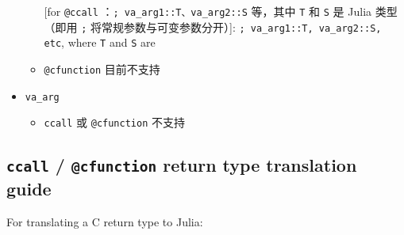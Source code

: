 \begin{itemize}
\begin{itemize}
\item [[for \texttt{@ccall}]：\texttt{; va\_arg1::T、va\_arg2::S} 等，其中 \texttt{T} 和 \texttt{S} 是 Julia 类型（即用 \texttt{;} 将常规参数与可变参数分开）]: \texttt{; va\_arg1::T, va\_arg2::S, etc}, where \texttt{T} and \texttt{S} are


\item \texttt{@cfunction} 目前不支持

\end{itemize}

\item \texttt{va\_arg}

\begin{itemize}
\item \texttt{ccall} 或 \texttt{@cfunction} 不支持

\end{itemize}
\end{itemize}


\hypertarget{13507762415394207754}{}


\subsection{\texttt{ccall} / \texttt{@cfunction} return type translation guide}



For translating a C return type to Julia:



